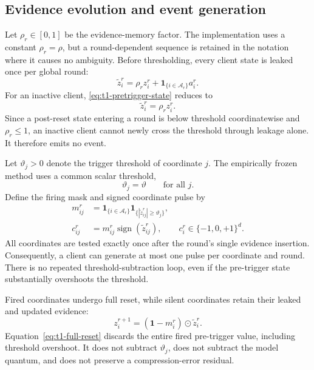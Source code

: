 \subsection{Evidence evolution and event generation}

Let $\rho_r\in[0,1]$ be the evidence-memory factor. The implementation uses a constant $\rho_r=\rho$, but a round-dependent sequence is retained in the notation where it causes no ambiguity. Before thresholding, every client state is leaked once per global round:
\begin{equation}
    \widetilde z_i^r
    =
    \rho_r z_i^r
    +
    \mathbf{1}_{\{i\in\mathcal{A}_r\}}a_i^r.
    \label{eq:t1-pretrigger-state}
\end{equation}
For an inactive client, \eqref{eq:t1-pretrigger-state} reduces to
\begin{equation}
    \widetilde z_i^r=\rho_r z_i^r.
\end{equation}
Since a post-reset state entering a round is below threshold coordinatewise and $\rho_r\leq1$, an inactive client cannot newly cross the threshold through leakage alone. It therefore emits no event.

Let $\vartheta_j>0$ denote the trigger threshold of coordinate $j$. The empirically frozen method uses a common scalar threshold,
\begin{equation}
    \vartheta_j=\vartheta
    \qquad\text{for all }j.
    \label{eq:t1-common-threshold}
\end{equation}
Define the firing mask and signed coordinate pulse by
\begin{align}
    m_{ij}^r
    &=
    \mathbf{1}_{\{i\in\mathcal{A}_r\}}
    \mathbf{1}_{\{|\widetilde z_{ij}^r|\geq\vartheta_j\}},
    \label{eq:t1-mask}\\
    c_{ij}^r
    &=
    m_{ij}^r\operatorname{sign}(\widetilde z_{ij}^r),
    \qquad
    c_i^r\in\{-1,0,+1\}^d.
    \label{eq:t1-client-pulse}
\end{align}
All coordinates are tested exactly once after the round's single evidence insertion. Consequently, a client can generate at most one pulse per coordinate and round. There is no repeated threshold-subtraction loop, even if the pre-trigger state substantially overshoots the threshold.

Fired coordinates undergo full reset, while silent coordinates retain their leaked and updated evidence:
\begin{equation}
    z_i^{r+1}
    =
    (\mathbf{1}-m_i^r)\odot\widetilde z_i^r.
    \label{eq:t1-full-reset}
\end{equation}
Equation~\eqref{eq:t1-full-reset} discards the entire fired pre-trigger value, including threshold overshoot. It does not subtract $\vartheta_j$, does not subtract the model quantum, and does not preserve a compression-error residual.

